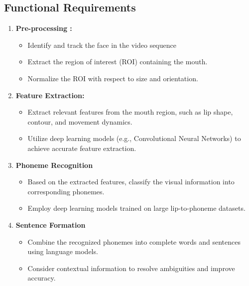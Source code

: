 \subsection{Functional Requirements}
\begin{enumerate}
\item \textbf{Pre-processing :}
\begin{itemize}
\item Identify and track the face in the video sequence
\item Extract the region of interest (ROI) containing the mouth.
\item Normalize the ROI with respect to size and orientation. 

\end{itemize}
\item  \textbf{Feature Extraction:}
\begin{itemize}
\item Extract relevant features from the mouth region, such as lip shape, contour, and movement dynamics. 
\item Utilize deep learning models (e.g., Convolutional Neural Networks) to achieve accurate feature extraction.


\end{itemize}
\item \textbf{Phoneme Recognition}
\begin{itemize}
\item Based on the extracted features, classify the visual information into corresponding phonemes.
\item Employ deep learning models trained on large lip-to-phoneme datasets.


\end{itemize}
\item \textbf{Sentence Formation}
\begin{itemize}
\item Combine the recognized phonemes into complete words and sentences using language models. 
\item Consider contextual information to resolve ambiguities and improve accuracy.


\end{itemize}


\end{enumerate}
